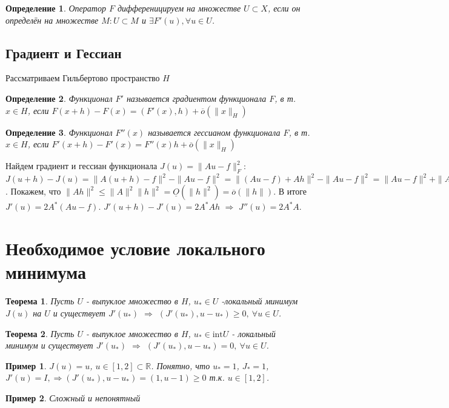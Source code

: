 \documentclass[9pt, a4paper]{extarticle}
\newtheorem*{theorem*}{Теорема}
\newtheorem*{definition}{Определение}
\newtheorem*{sample}{Пример}
\begin{document}
	\begin{definition}
			Оператор $F$ дифференицируем на множестве $U \subset X$, если он определён на множестве $M: U \subset M$ и $\exists F'(u), \forall u \in U$. 
	\end{definition}
	\subsection*{Градиент и Гессиан}
	Рассматриваем Гильбертово пространство $H$
	\begin{definition}
		Функционал $F'$ называется градиентом функционала $F$, в т. $x \in H$, если $F(x + h) - F(x) = (F'(x), h) + \overline{o}(\|x\|_H)$
	\end{definition}
	\begin{definition}
		Функционал $F''(x)$ называется гессианом функционала $F$, в т. $x \in H$, если $F'(x + h) - F'(x) = F''(x)h + \overline{o}(\|x\|_H)$
	\end{definition}
	Найдем градиент и гессиан функционала $J(u) = \|Au - f\|_F^2$: \newline
	$J(u+h) - J(u) = \|A(u+h) - f\|^2 - \|Au - f\|^2 = \|(Au - f) + Ah\|^2 - \|Au - f\|^2 = \|Au - f\|^2 + \|Ah\|^2 + 2 (Au - f, Ah) - \|Au -f\|^2 = (Au - f, Ah) + \|Ah\|^2$. Покажем, что  $\|Ah\|^2 \leq \|A\|^2 \|h\|^2 = \underline{O}(\|h\|^2) = \overline{o}(\|h\|)$. \newline
	В итоге $J'(u) = 2 A^*(Au - f)$.\newline
	$J'(u+h) - J'(u) = 2A^*A h$ $\Rightarrow$ $J''(u) = 2A^*A$.
	
\section{Необходимое условие локального минимума}
	\begin{theorem*}
		Пусть $U$ - выпуклое множество в $H$, $u_* \in U$ -локальный минимум $J(u)$ на $U$ и существует $J'(u_*)$ $\Rightarrow$ $(J'(u_*), u - u_*) \geq 0, \ \forall u \in U$. 
	\end{theorem*}
	\begin{theorem*}
		Пусть $U$ - выпуклое множество в $H$, $u_* \in \text{int}U$ - локальный минимум и  существует $J'(u_*)$ $\Rightarrow$ $(J'(u_*), u - u_*) = 0, \ \forall u \in U$. 
	\end{theorem*}
	\begin{sample}
		$J(u) = u$, $u \in [1,2] \subset \mathbb{R}$. Понятно, что $u_* = 1$, $J_* = 1$, $J'(u) = I, \Rightarrow (J'(u_*), u- u_*) = (1, u - 1) \geq 0$ т.к. $u \in [1,2]$.
	\end{sample}
	\begin{sample}
		Сложный и непонятный
		
	\end{sample}
\end{document}
